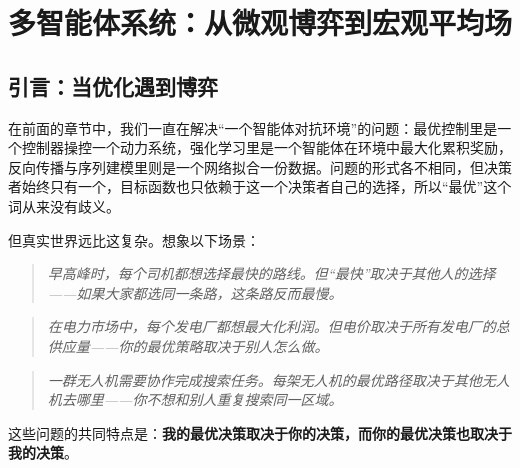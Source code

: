 \chapter{多智能体系统：从微观博弈到宏观平均场}

\section*{引言：当优化遇到博弈}



在前面的章节中，我们一直在解决“一个智能体对抗环境”的问题：最优控制里是一个控制器操控一个动力系统，强化学习里是一个智能体在环境中最大化累积奖励，反向传播与序列建模里则是一个网络拟合一份数据。问题的形式各不相同，但决策者始终只有一个，目标函数也只依赖于这一个决策者自己的选择，所以“最优”这个词从来没有歧义。

但真实世界远比这复杂。想象以下场景：

\begin{quote}
\textit{早高峰时，每个司机都想选择最快的路线。但“最快”取决于其他人的选择——如果大家都选同一条路，这条路反而最慢。}
\end{quote}

\begin{quote}
\textit{在电力市场中，每个发电厂都想最大化利润。但电价取决于所有发电厂的总供应量——你的最优策略取决于别人怎么做。}
\end{quote}

\begin{quote}
\textit{一群无人机需要协作完成搜索任务。每架无人机的最优路径取决于其他无人机去哪里——你不想和别人重复搜索同一区域。}
\end{quote}

这些问题的共同特点是：\textbf{我的最优决策取决于你的决策，而你的最优决策也取决于我的决策}。

